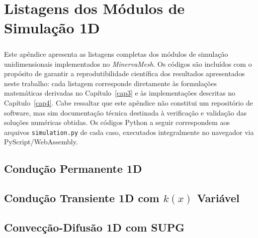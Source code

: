 \chapter{Listagens dos Módulos de Simulação 1D}
\label{ApendiceA}

\paragraph{}Este apêndice apresenta as listagens completas dos módulos de simulação unidimensionais implementados no \textit{MinervaMesh}. Os códigos são incluídos com o propósito de garantir a reprodutibilidade científica dos resultados apresentados neste trabalho: cada listagem corresponde diretamente às formulações matemáticas derivadas no Capítulo~\ref{cap3} e às implementações descritas no Capítulo~\ref{cap4}. Cabe ressaltar que este apêndice não constitui um repositório de software, mas sim documentação técnica destinada à verificação e validação das soluções numéricas obtidas. Os códigos Python a seguir correspondem aos arquivos \texttt{simulation.py} de cada caso, executados integralmente no navegador via PyScript/WebAssembly.

\section{Condução Permanente 1D}
\label{ap:conducao1d}



\section{Condução Transiente 1D com $k(x)$ Variável}
\label{ap:calor_transiente}



\section{Convecção-Difusão 1D com SUPG}
\label{ap:convdif1d}



